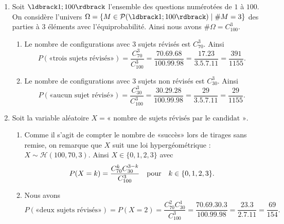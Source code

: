 \documentclass[12pt,reqno]{amsart}
\begin{document}
\begin{solution}
  \begin{enumerate}
    \item Soit $\iintv{1;100}$ l'ensemble des questions numérotées de $1$ à $100$. On considère l'univers $\Omega = \{M \in \mathcal{P}(\iintv{1;100}) \;|\; \#M=3\}$ des parties à $3$ éléments avec l'équiprobabilité. Ainsi nous avons $\#\Omega = C_{100}^{3}$.
    \begin{enumerate}
      \item Le nombre de configurations avec $3$ sujets révisés est $C_{70}^{3}$. Ainsi
      $$
        P(\text{«trois sujets révisés»}) = \frac{C_{70}^{3}}{C_{100}^{3}} = \frac{70.69.68}{100.99.98} = \frac{17.23}{3.5.7.11} = \frac{391}{1155}.
      $$
      \item Le nombre de configurations avec $3$ sujets non révisés est $C_{30}^{3}$. Ainsi
      $$
        P(\text{«aucun sujet révisé»}) = \frac{C_{30}^{3}}{C_{100}^{3}} = \frac{30.29.28}{100.99.98} = \frac{29}{3.5.7.11} = \frac{29}{1155}.
      $$
    \end{enumerate}
    \item Soit la variable aléatoire $X=\text{« nombre de sujets révisés par le candidat »}$.
    \begin{enumerate}
      \item Comme il s'agit de compter le nombre de «succès» lors de tirages sans remise, on remarque que $X$ suit une loi hypergéométrique : $X \sim \mathcal{H}(100,70,3)$. Ainsi $X \in \{0,1,2,3\}$ avec
      $$
        P(X=k) = \frac{C_{70}^{k}C_{30}^{3-k}}{C_{100}^{3}}
          \text{\quad pour\quad}
            k \in \{0,1,2,3\}.
      $$
      \item Nous avons
      $$
        P(\text{«deux sujets révisés»}) = P(X=2) = \frac{C_{70}^{2}C_{30}^{1}}{C_{100}^{3}} = \frac{70.69.30.3}{100.99.98} = \frac{23.3}{2.7.11} = \frac{69}{154}.
      $$
    \end{enumerate}
  \end{enumerate}
\end{solution}

\end{document}
